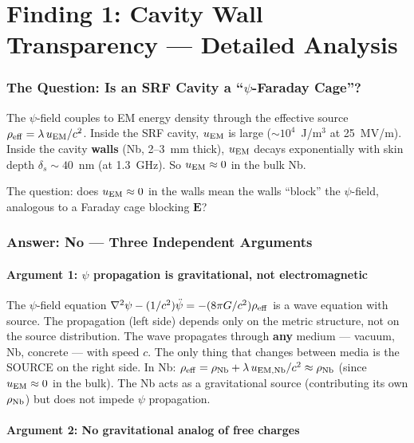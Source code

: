 \documentclass[11pt]{article}
\theoremstyle{definition}
\theoremstyle{remark}
\begin{document}
\part{Finding 1: Cavity Wall Transparency --- Detailed Analysis}
\label{part:transparency}


\section{The Question: Is an SRF Cavity a ``$\psi$-Faraday Cage''?}

The $\psi$-field couples to EM energy density through the effective
source $\rho_{\rm eff} = \lambda\,u_{\rm EM}/c^2$. Inside the SRF
cavity, $u_{\rm EM}$ is large ($\sim 10^4$~J/m$^3$ at 25~MV/m).
Inside the cavity \textbf{walls} (Nb, 2--3~mm thick), $u_{\rm EM}$
decays exponentially with skin depth $\delta_s \sim 40$~nm (at 1.3~GHz).
So $u_{\rm EM} \approx 0$ in the bulk Nb.

The question: does $u_{\rm EM} \approx 0$ in the walls mean the
walls ``block'' the $\psi$-field, analogous to a Faraday cage
blocking $\mathbf{E}$?

\section{Answer: No --- Three Independent Arguments}

\subsection{Argument 1: $\psi$ propagation is gravitational, not electromagnetic}

The $\psi$-field equation $\nabla^2\psi - (1/c^2)\ddot\psi = -(8\pi G/c^2)
\rho_{\rm eff}$ is a wave equation with source. The propagation (left side)
depends only on the metric structure, not on the source distribution.
The wave propagates through \textbf{any} medium --- vacuum, Nb, concrete ---
with speed $c$. The only thing that changes between media is the SOURCE
on the right side. In Nb: $\rho_{\rm eff} = \rho_{\rm Nb} + \lambda\,
u_{\rm EM,Nb}/c^2 \approx \rho_{\rm Nb}$ (since $u_{\rm EM} \approx 0$
in the bulk). The Nb acts as a gravitational source (contributing its
own $\rho_{\rm Nb}$) but does not impede $\psi$ propagation.

\subsection{Argument 2: No gravitational analog of free charges}
\end{document}
